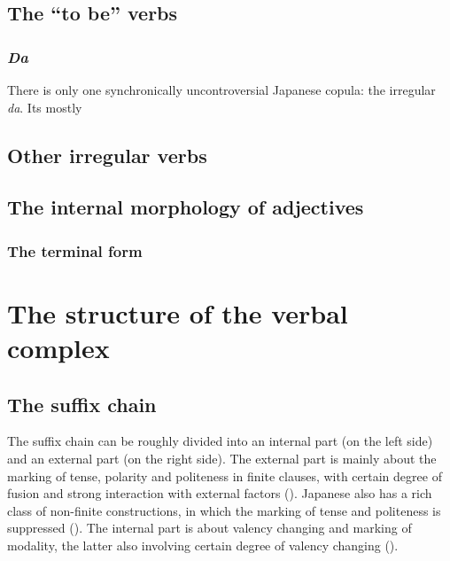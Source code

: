 \documentclass[UTF8, a4paper, oneside, scheme=plain]{ctexrep}
\newcommand{\corpus}[1]{\emph{#1}}
\begin{document}
\subsection{The ``to be'' verbs}

\subsubsection{\corpus{Da}}\label{sec:copula-da}

There is only one synchronically uncontroversial Japanese copula:
the irregular \corpus{da}.
Its mostly 

\subsection{Other irregular verbs}

\subsection{The internal morphology of adjectives}\label{sec:adjective-internal-form}

\subsubsection{The terminal form}\label{sec:adjective-terminal-form}

\section{The structure of the verbal complex}\label{sec:verbal-complex-overview}

\subsection{The suffix chain}\label{sec:suffix-chain}

The suffix chain can be roughly divided into an internal part (on the left side) 
and an external part (on the right side). 
The external part is mainly about 
the marking of tense, polarity and politeness in finite clauses,
with certain degree of fusion
and strong interaction with external factors ().
Japanese also has a rich class of non-finite constructions,
in which the marking of tense and politeness is suppressed ().
The internal part is about valency changing and marking of modality,
the latter also involving certain degree of valency changing ().
\end{document}
